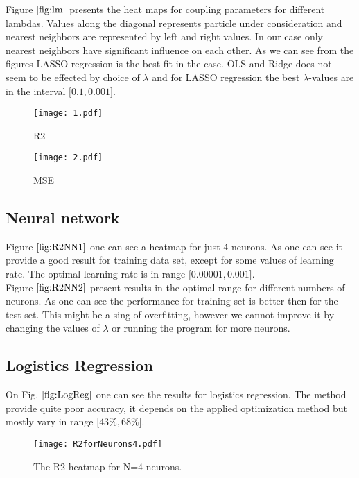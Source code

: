 \documentclass[10pt]{article}
\begin{document}
Figure $\ref{fig:lm}$ presents the heat maps for coupling parameters for different lambdas. Values along the diagonal represents particle under consideration and nearest neighbors are represented by left and right values. In our case only nearest neighbors have significant influence on each other. As we can see from the figures LASSO regression is the best fit in the case. OLS and Ridge does not seem to be effected by choice of $\lambda$ and for LASSO regression the best $\lambda$-values are in the interval $\lbrack \num{0.1} , \num{0.001} \rbrack$.

\begin{figure}
	\centerline{\texttt{[image: 1.pdf]}}
	\caption{R2}
	\label{plt:R2"}
\end{figure}

\begin{figure}
	\centerline{\texttt{[image: 2.pdf]}}
	\caption{MSE}
	\label{plt:MSE"}
\end{figure}

\subsection{Neural network}
Figure $\ref{fig:R2NN1}$ one can see a heatmap for just 4 neurons. As one can see it provide a good result for training data set, except for some values of learning rate. The optimal learning rate is in range $\lbrack \num{0.00001} , \num{0.001} \rbrack$.\\
Figure $\ref{fig:R2NN2}$ present results in the optimal range for different numbers of neurons. As one can see the performance for training set is better then for the test set. This might be a sing of overfitting, however we cannot improve it by changing the values of $\lambda$ or running the program for more neurons. \\
\subsection{Logistics Regression}
On Fig. $\ref{fig:LogReg}$ one can see the results for logistics regression. The method provide quite poor accuracy, it  depends on the applied optimization method but mostly vary in range $\lbrack 43\% , 68\% \rbrack$.
	\begin{figure}
		\centering
		\texttt{[image: R2forNeurons4.pdf]}
		\caption[ The R2 heatmap for N=4 neurons.]
		{\small The R2 heatmap for N=4 neurons.} 
		\label{fig:R2NN1}
	\end{figure}
\end{document}
